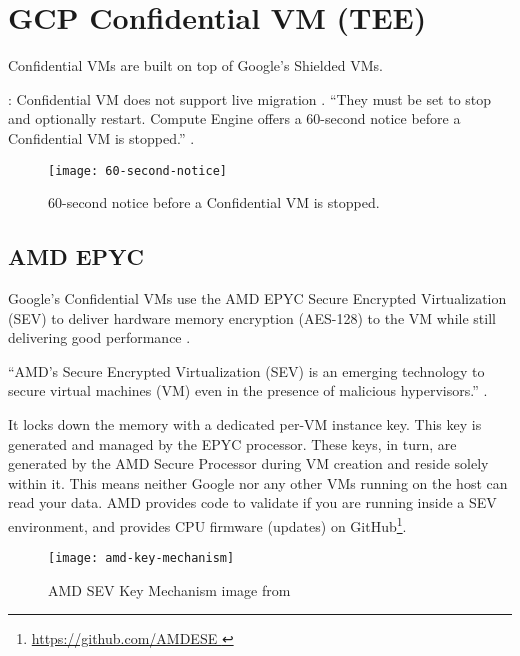 
\section*{GCP Confidential VM (TEE)}


Confidential VMs are built on top of Google's Shielded VMs. 

: Confidential VM does not support live migration 
\citep{google_creating_2022}. 
“They must be set to stop and optionally restart. 
Compute Engine offers a 60-second notice before a Confidential VM is stopped.” 
\citep{google_live_2022}.

\begin{figure}[!ht]
    \centering
    \texttt{[image: 60-second-notice]}
    \caption{60-second notice before a Confidential VM is stopped.}
    \label{fig:60-second-notice}
\end{figure}

\subsection*{AMD EPYC} 
Google's Confidential VMs use the AMD EPYC Secure Encrypted Virtualization (SEV) 
to deliver hardware memory encryption (AES-128) to the VM 
while still delivering good performance \citep{amd_amd_2022, amd_secure_2019}. 

“AMD’s Secure Encrypted Virtualization (SEV) is an emerging technology to secure virtual machines (VM) 
even in the presence of malicious hypervisors.” \citep{li_exploiting_2019}.

It locks down the memory with a dedicated per-VM instance key. 
This key is generated and managed by the EPYC processor. 
These keys, in turn, are generated by the AMD Secure Processor during VM creation and reside solely within it.
This means neither Google nor any other VMs running on the host can read your data. 
AMD provides code to validate if you are running inside a SEV environment, 
and provides CPU firmware (updates) on GitHub\footnote{\url{https://github.com/AMDESE }}.

\begin{figure}[!ht]
    \centering
    \texttt{[image: amd-key-mechanism]}
    \caption{AMD SEV Key Mechanism image from \cite{amd_amd_2020}}
    \label{fig:amd-key-mechanism}
\end{figure}



